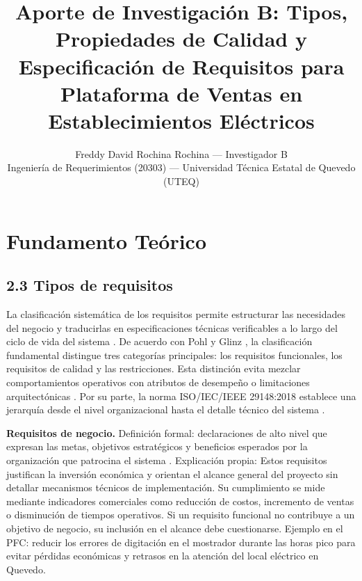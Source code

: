 \documentclass[onecolumn,12pt]{IEEEtran}
\begin{document}
	\nocite{iso29148,iso15288,iso12207,iso25010,pohl2025,swebok4,pmbok7,ireb2023,mavin2009}
	
	\title{Aporte de Investigaci\'on B: Tipos, Propiedades de Calidad y Especificaci\'on de Requisitos para Plataforma de Ventas en Establecimientos El\'ectricos}
	\author{Freddy David Rochina Rochina --- Investigador B\\
		Ingenier\'ia de Requerimientos (20303) --- Universidad T\'ecnica Estatal de Quevedo (UTEQ)}
	\maketitle
	
	\section{Fundamento Te\'orico}
	
	\subsection{2.3 Tipos de requisitos}
	
	La clasificaci\'on sistem\'atica de los requisitos permite estructurar las necesidades del negocio y traducirlas en especificaciones t\'ecnicas verificables a lo largo del ciclo de vida del sistema \cite{iso29148,iso15288,iso12207}. De acuerdo con Pohl \cite{pohl2025} y Glinz \cite{glinz2007}, la clasificaci\'on fundamental distingue tres categor\'ias principales: los requisitos funcionales, los requisitos de calidad y las restricciones. Esta distinci\'on evita mezclar comportamientos operativos con atributos de desempe\~no o limitaciones arquitect\'onicas \cite{pohl2025,glinz2007}. Por su parte, la norma ISO/IEC/IEEE 29148:2018 establece una jerarqu\'ia desde el nivel organizacional hasta el detalle t\'ecnico del sistema \cite{iso29148}.
	
	\textbf{Requisitos de negocio.} Definici\'on formal: declaraciones de alto nivel que expresan las metas, objetivos estrat\'egicos y beneficios esperados por la organizaci\'on que patrocina el sistema \cite{iso29148,wiegers2013}. Explicaci\'on propia: Estos requisitos justifican la inversi\'on econ\'omica y orientan el alcance general del proyecto sin detallar mecanismos t\'ecnicos de implementaci\'on. Su cumplimiento se mide mediante indicadores comerciales como reducci\'on de costos, incremento de ventas o disminuci\'on de tiempos operativos. Si un requisito funcional no contribuye a un objetivo de negocio, su inclusi\'on en el alcance debe cuestionarse. Ejemplo en el PFC: reducir los errores de digitaci\'on en el mostrador durante las horas pico para evitar p\'erdidas econ\'omicas y retrasos en la atenci\'on del local el\'ectrico en Quevedo.
	
\end{document}
